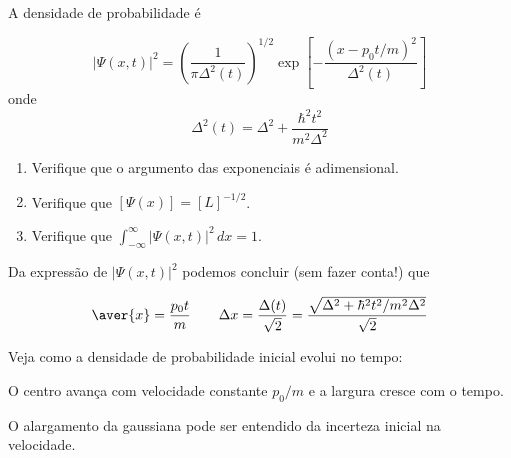 A densidade de probabilidade é

\begin{equation}
    |\Psi(x,t)|^2 = \left(\frac{1}{\pi\Delta^2(t)}\right)^{1/2} \exp\left[-\frac{(x-p_0t/m)^2}{\Delta^2(t)}\right]
\label{eq:aula14_densidade_prob}
\end{equation}
onde
\begin{equation}
    \Delta^2(t) = \Delta^2 + \frac{\hbar^2 t^2}{m^2\Delta^2}
\label{eq:aula14_Delta_t}
\end{equation}

\begin{enumerate}
    \item Verifique que o argumento das exponenciais é adimensional.
    \item Verifique que $[\Psi(x)] = [L]^{-1/2}$.
    \item Verifique que $\displaystyle\int_{-\infty}^{\infty} |\Psi(x,t)|^2\, dx = 1$.
\end{enumerate}

Da expressão de $|\Psi(x,t)|^2$ podemos concluir (sem fazer conta!) que

\begin{equation}
    \aver{x} = \frac{p_0 t}{m} \qquad \Delta x = \frac{\Delta(t)}{\sqrt{2}} = \frac{\sqrt{\Delta^2 + \hbar^2t^2/m^2\Delta^2}}{\sqrt{2}}
\label{eq:aula14_aver_x_t}
\end{equation}

Veja como a densidade de probabilidade inicial evolui no tempo:

\begin{center}
\end{center}

O centro avança com velocidade constante $p_0/m$ e a largura cresce com o tempo.

O alargamento da gaussiana pode ser entendido da incerteza inicial na velocidade.

